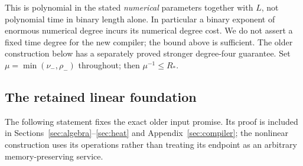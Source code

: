 \documentclass[11pt,a4paper]{amsart}
\theoremstyle{definition}
\theoremstyle{remark}
\numberwithin{equation}{section}
\begin{document}
This is polynomial in the stated \emph{numerical} parameters together with
$L$, not polynomial time in binary length alone. In particular a binary
exponent of enormous numerical degree incurs its numerical degree cost.
We do not assert a fixed time degree for the new compiler; the bound above
is sufficient. The older construction below has a separately proved
stronger degree-four guarantee. Set $\mu=\min(\nu_-,\rho_-)$ throughout;
then $\mu^{-1}\le R_*$.

\subsection{The retained linear foundation}
The following statement fixes the exact older input promise. Its proof is
included in Sections~\ref{sec:algebra}--\ref{sec:heat} and
Appendix~\ref{sec:compiler}; the nonlinear construction uses its operations
rather than treating its endpoint as an arbitrary memory-preserving service.
\end{document}
